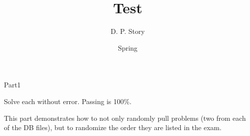 \documentclass{article}
\title[T\nExam]{Test \nExam}
\author{D. P. Story}
\date{Spring \the\year}
\begin{document}
\maketitle

\begin{exam}{Part1}

\begin{instructions}
Solve each without error. Passing is 100\%.

\medskip\noindent
This part demonstrates how to not only randomly pull problems
(two from each of the DB files), but to randomize the order they
are listed in the exam.
\end{instructions}

\ranToksOff %

{%
  {}
  {}
  {}
  {}
}

\end{exam}
\end{document}
